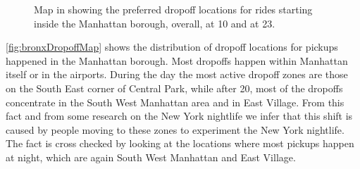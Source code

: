 \documentclass{acm_proc_article-sp-sigmod09}
\begin{document}
\begin{figure}
	\caption{Map in showing the preferred dropoff locations for rides starting inside the Manhattan borough, overall, at 10 and at 23.}
	
\end{figure}

\cref{fig:bronxDropoffMap} shows the distribution of dropoff locations for pickups happened in the Manhattan borough. Most dropoffs happen within Manhattan itself or in the airports. During the day the most active dropoff zones are those on the South East corner of Central Park, while after 20, most of the dropoffs concentrate in the South West Manhattan area and in East Village. From this fact and from some research on the New York nightlife we infer that this shift is caused by people moving to these zones to experiment the New York nightlife. The fact is cross checked by looking at the locations where most pickups happen at night, which are again South West Manhattan and East Village.
\end{document}
